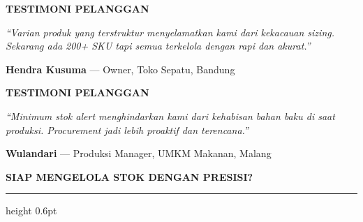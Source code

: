 \documentclass[a4paper]{article}
\newcommand{\sectiontitle}[1]{%
    \vspace{10pt}%
    {\fontsize{13}{16}\selectfont\bfseries\color{BlueDark} #1}\par\vspace{3pt}%
    {\color{BluePrimary}\hrule height 0.6pt}\par\vspace{8pt}}
\begin{document}
\noindent
\begin{minipage}[t]{0.485\textwidth}
    \colorbox{CyanBg}{%
        \begin{minipage}{\dimexpr\textwidth-2\fboxsep\relax}
            {\fontsize{10}{13}\selectfont\bfseries\color{CyanDark} TESTIMONI PELANGGAN}
        \end{minipage}}\par
    \vspace{4pt}

    {\fontsize{9}{13}\selectfont\color{TextDark}
    \textit{``Varian produk yang terstruktur menyelamatkan kami dari kekacauan sizing. Sekarang ada 200+ SKU tapi semua terkelola dengan rapi dan akurat.''}

    \vspace{4pt}
    {\bfseries\color{CyanDark} Hendra Kusuma} {\color{TextLight}--- Owner, Toko Sepatu, Bandung}}
\end{minipage}%
\hfill%
\begin{minipage}[t]{0.485\textwidth}
    \colorbox{CyanBg}{%
        \begin{minipage}{\dimexpr\textwidth-2\fboxsep\relax}
            {\fontsize{10}{13}\selectfont\bfseries\color{CyanDark} TESTIMONI PELANGGAN}
        \end{minipage}}\par
    \vspace{4pt}

    {\fontsize{9}{13}\selectfont\color{TextDark}
    \textit{``Minimum stok alert menghindarkan kami dari kehabisan bahan baku di saat produksi. Procurement jadi lebih proaktif dan terencana.''}

    \vspace{4pt}
    {\bfseries\color{CyanDark} Wulandari} {\color{TextLight}--- Produksi Manager, UMKM Makanan, Malang}}
\end{minipage}

\vspace{8pt}

\sectiontitle{SIAP MENGELOLA STOK DENGAN PRESISI?}
\end{document}
